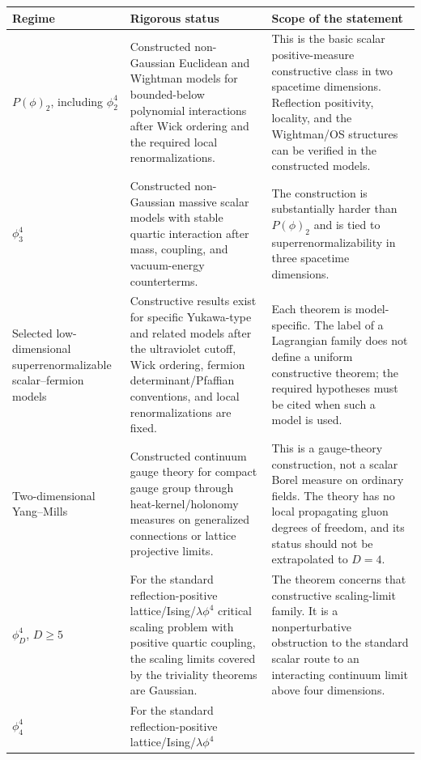 \begin{table}[H]
\centering
\scriptsize
\renewcommand{\arraystretch}{0.96}
\begin{tabular}{@{}>{\raggedright\arraybackslash}p{}
  >{\raggedright\arraybackslash}p{}
  >{\raggedright\arraybackslash}p{}@{}}
\hline
Regime & Rigorous status & Scope of the statement \\
\hline
\(P(\phi)_2\), including \(\phi^4_2\) &
Constructed non-Gaussian Euclidean and Wightman models for bounded-below
polynomial interactions after Wick ordering and the required local
renormalizations. &
This is the basic scalar positive-measure constructive class in two
spacetime dimensions.  Reflection positivity, locality, and the Wightman/OS
structures can be verified in the constructed models. \\
\(\phi^4_3\) &
Constructed non-Gaussian massive scalar models with stable quartic
interaction after mass, coupling, and vacuum-energy counterterms. &
The construction is substantially harder than \(P(\phi)_2\) and is tied to
superrenormalizability in three spacetime dimensions. \\
Selected low-dimensional superrenormalizable scalar--fermion models &
Constructive results exist for specific Yukawa-type and related models after
the ultraviolet cutoff, Wick ordering, fermion determinant/Pfaffian
conventions, and local renormalizations are fixed. &
Each theorem is model-specific.  The label of a Lagrangian family does not
define a uniform constructive theorem; the required hypotheses must be cited
when such a model is used. \\
Two-dimensional Yang--Mills &
Constructed continuum gauge theory for compact gauge group through
heat-kernel/holonomy measures on generalized connections or lattice
projective limits. &
This is a gauge-theory construction, not a scalar Borel measure on ordinary
fields.  The theory has no local propagating gluon degrees of freedom, and its
status should not be extrapolated to \(D=4\). \\
\(\phi^4_D\), \(D\ge5\) &
For the standard reflection-positive lattice/Ising/\(\lambda\phi^4\)
critical scaling problem with positive quartic coupling, the scaling limits
covered by the triviality theorems are Gaussian. &
The theorem concerns that constructive scaling-limit family.  It is a
nonperturbative obstruction to the standard scalar route to an interacting
continuum limit above four dimensions. \\
\(\phi^4_4\) &
For the standard reflection-positive lattice/Ising/\(\lambda\phi^4\)

\end{tabular}
\end{table}
